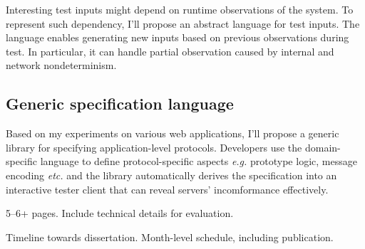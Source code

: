 \documentclass{article}
\begin{document}
Interesting test inputs might depend on runtime observations of the system.  To
represent such dependency, I'll propose an abstract language for test inputs.
The language enables generating new inputs based on previous observations during
test.  In particular, it can handle partial observation caused by internal and
network nondeterminism.

\subsection{Generic specification language}
Based on my experiments on various web applications, I'll propose a generic
library for specifying application-level protocols.  Developers use the
domain-specific language to define protocol-specific aspects {\it e.g.}
prototype logic, message encoding {\it etc.}  and the library automatically
derives the specification into an interactive tester client that can reveal
servers' incomformance effectively.

5--6+ pages.  Include technical details for evaluation.

Timeline towards dissertation.  Month-level schedule, including publication.
\end{document}
